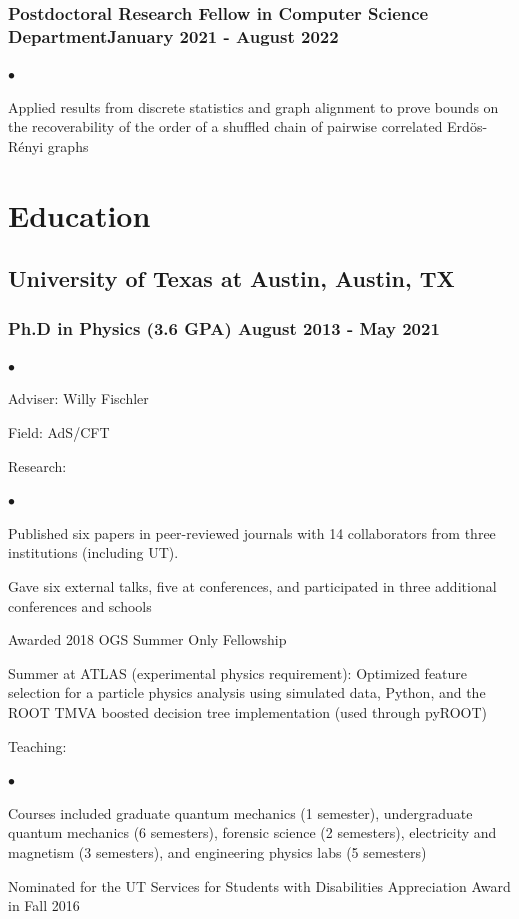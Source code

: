 \documentclass[letterpaper]{article}
\renewenvironment{itemize}{
  \begin{list}{$\bullet$}{
    \setlength{\itemsep}{0em}
    \setlength{\parskip}{0em}
    \setlength{\parsep}{0em} 
    \setlength{\topsep}{0em} 
  }
}{
  \end{list}
}
\begin{document}
\subsubsection*{Postdoctoral Research Fellow in Computer Science Department\hfill January 2021 - August 2022}
    \begin{itemize}
        \item Applied results from discrete statistics and graph alignment to prove bounds on the recoverability of the order of a shuffled chain of pairwise correlated Erd\"os-R\'enyi graphs
    \end{itemize}

\section*{Education}

\subsection*{University of Texas at Austin, Austin, TX}
\subsubsection*{Ph.D in Physics (3.6 GPA) \hfill August 2013 - May 2021}

\begin{itemize}
    \item Adviser: Willy Fischler
    \item Field: AdS/CFT
    \item Research: 
    \begin{itemize}
        \item Published six papers in peer-reviewed journals with 14 collaborators from three institutions (including UT).
        \item Gave six external talks, five at conferences, and participated in three additional conferences and schools
        \item Awarded 2018 OGS Summer Only Fellowship
        \item Summer at ATLAS (experimental physics requirement): Optimized feature selection for a particle physics analysis using simulated data, Python, and the ROOT TMVA boosted decision tree implementation (used through pyROOT)
    \end{itemize}
    \item Teaching: 
    \begin{itemize}
        \item Courses included graduate quantum mechanics (1 semester), undergraduate quantum mechanics (6 semesters), forensic science (2 semesters), electricity and magnetism (3 semesters), and engineering physics labs (5 semesters)
        \item Nominated for the UT Services for Students with Disabilities Appreciation Award in Fall 2016
    \end{itemize}
\end{itemize}
\end{document}
